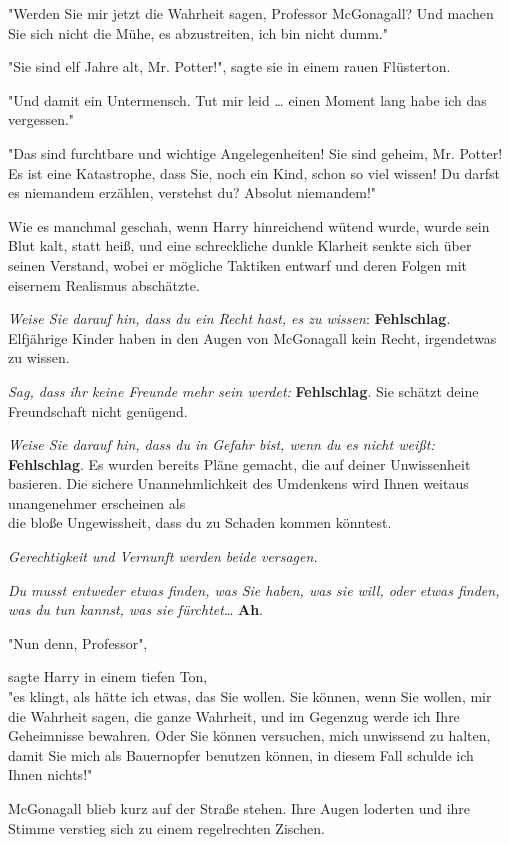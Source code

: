 {"Werden Sie mir jetzt die Wahrheit sagen, Professor McGonagall? Und machen Sie sich nicht die Mühe, es abzustreiten, ich bin nicht dumm."

"Sie sind elf Jahre alt, Mr. Potter!", sagte sie in einem rauen Flüsterton.

"Und damit ein Untermensch. Tut mir leid … einen Moment lang habe ich das vergessen."

"Das sind furchtbare und wichtige Angelegenheiten! Sie sind geheim, Mr. Potter! Es ist eine Katastrophe, dass Sie, noch ein Kind, schon so viel wissen! Du darfst es niemandem erzählen, verstehst du? Absolut niemandem!"

Wie es manchmal geschah, wenn Harry hinreichend wütend wurde, wurde sein Blut kalt, statt heiß, und eine schreckliche dunkle Klarheit senkte sich über seinen Verstand, wobei er mögliche Taktiken entwarf und deren Folgen mit eisernem Realismus abschätzte.

\emph{Weise Sie darauf hin, dass du ein Recht hast, es zu wissen}: \textbf{Fehlschlag}. Elfjährige Kinder haben in den Augen von McGonagall kein Recht, irgendetwas zu wissen.

\emph{Sag, dass ihr keine Freunde mehr sein werdet:} \textbf{Fehlschlag}. Sie schätzt deine Freundschaft nicht genügend.

\emph{Weise Sie darauf hin, dass du in Gefahr bist, wenn du es nicht weißt:} \textbf{Fehlschlag}. Es wurden bereits Pläne gemacht, die auf deiner Unwissenheit basieren. Die sichere Unannehmlichkeit des Umdenkens wird Ihnen weitaus unangenehmer erscheinen als\\ die bloße Ungewissheit, dass du zu Schaden kommen könntest.

\emph{Gerechtigkeit und Vernunft werden beide versagen.}

\emph{Du musst entweder etwas finden, was Sie haben, was sie will, oder etwas finden, was du tun kannst, was sie fürchtet}… \textbf{Ah}.

"Nun denn, Professor",

sagte Harry in einem tiefen Ton,\\ "es klingt, als hätte ich etwas, das Sie wollen. Sie können, wenn Sie wollen, mir die Wahrheit sagen, die ganze Wahrheit, und im Gegenzug werde ich Ihre Geheimnisse bewahren. Oder Sie können versuchen, mich unwissend zu halten, damit Sie mich als Bauernopfer benutzen können, in diesem Fall schulde ich Ihnen nichts!"

McGonagall blieb kurz auf der Straße stehen. Ihre Augen loderten und ihre Stimme verstieg sich zu einem regelrechten Zischen.

}
